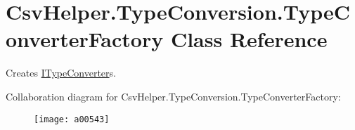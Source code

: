 \hypertarget{a00155}{\section{Csv\-Helper.\-Type\-Conversion.\-Type\-Converter\-Factory Class Reference}
\label{a00155}
}


Creates \hyperlink{a00117}{I\-Type\-Converter}s.  




Collaboration diagram for Csv\-Helper.\-Type\-Conversion.\-Type\-Converter\-Factory\-:
\nopagebreak
\begin{figure}[H]
\begin{center}
\leavevmode
\texttt{[image: a00543]}
\end{center}
\end{figure}
